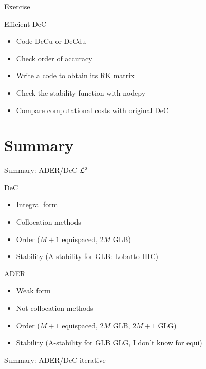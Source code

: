\documentclass[9pt,compress,t,aspectratio=169]{beamer}
\begin{document}
\begin{frame}{Exercise}
	\begin{block}{Efficient DeC}
		\begin{itemize}
			\item Code DeCu or DeCdu
			\item Check order of accuracy
			\item Write a code to obtain its RK matrix
			\item Check the stability function with nodepy
			\item Compare computational costs with original DeC
		\end{itemize}		
	\end{block}
	
\end{frame}
\section{Summary}

\begin{frame}{Summary: ADER/DeC $\mathcal{L}^2$}
	\begin{minipage}{0.49\textwidth}
	\begin{block}{DeC}
		\begin{itemize}
			\item Integral form
			\item Collocation methods
			\item Order ($M+1$ equispaced, $2M$ GLB)
			\item Stability (A-stability for GLB: Lobatto IIIC) 
		\end{itemize}
	\end{block}
	\end{minipage}\hfill
	\begin{minipage}{0.49\textwidth}
	\begin{block}{ADER}
		\begin{itemize}
			\item Weak form
			\item Not collocation methods
			\item Order ($M+1$ equispaced, $2M$ GLB, $2M+1$ GLG)
			\item Stability (A-stability for GLB GLG, I don't know for equi)
		\end{itemize}
	\end{block}
\end{minipage}
\end{frame}
\begin{frame}{Summary: ADER/DeC iterative}
\end{frame}
\end{document}
